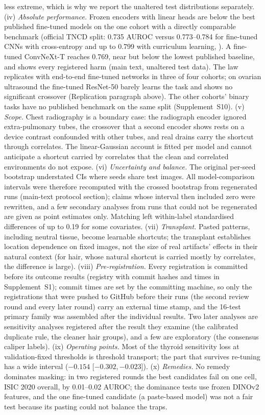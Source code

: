less extreme, which is why we report the unaltered test distributions separately.
(iv) \emph{Absolute performance.} Frozen encoders with linear heads are below the best published fine-tuned models on
the one cohort with a directly comparable benchmark (official TNCD split: 0.735 AUROC versus 0.773--0.784 for
fine-tuned CNNs with cross-entropy and up to 0.799 with curriculum learning, \citealp{gong2022acl}). A fine-tuned
ConvNeXt-T reaches 0.769, near but below the lowest published baseline, and shows every registered harm
(main text, unaltered test data). The law replicates with end-to-end fine-tuned networks in three of four cohorts; on ovarian ultrasound the fine-tuned ResNet-50
barely learns the task and shows no significant crossover (Replication paragraph above). The other cohorts' binary
tasks have no published benchmark on the same split (Supplement~S10).
(v) \emph{Scope.} Chest radiography is a boundary case: the radiograph encoder ignored extra-pulmonary tubes, the
crossover that a second encoder shows rests on a device contrast confounded with other tubes, and real drains carry the
shortcut through correlates. The linear-Gaussian account is fitted per model and cannot anticipate a shortcut
carried by correlates that the clean and correlated environments do not expose.
(vi) \emph{Uncertainty and balance.} The original per-seed bootstrap understated CIs where seeds share test
images. All model-comparison intervals were therefore recomputed with the crossed bootstrap from regenerated runs
(main-text protocol section);
claims whose interval then included zero were rewritten, and a few secondary analyses from runs that could not be
regenerated are given as point estimates only. Matching left within-label standardised
differences of up to 0.19 for some covariates. (vii) \emph{Transplant.} Pasted patterns, including neutral tissue,
become learnable shortcuts; the transplant establishes location dependence on fixed images, not the size of real
artifacts' effects in their natural context (for hair, whose natural shortcut is carried mostly by correlates, the
difference is large). (viii) \emph{Pre-registration.} Every registration is committed before its outcome results (registry with commit hashes
and times in Supplement~S1); commit times are set by the committing machine, so only the registrations that were
pushed to GitHub before their runs (the second review round and every later round) carry an external time stamp, and
the 16-test primary family was assembled after the individual results. Two later analyses are sensitivity analyses
registered after the result they examine (the calibrated duplicate rule, the cleaner hair groups), and a few are
exploratory (the consensus caliper labels). (ix) \emph{Operating points.} Most of the thyroid sensitivity loss at
validation-fixed thresholds is threshold transport; the part that survives re-tuning has a wide interval
($-0.154$ [$-0.302, -0.023$]). (x) \emph{Remedies.} No remedy dominates masking: in two registered rounds the best candidates fail on one cell, ISIC
2020 overall, by 0.01--0.02 AUROC; the dominance tests use frozen DINOv2 features, and the one fine-tuned candidate (a
paste-based model) was not a fair test because its pasting could not balance the traps.

